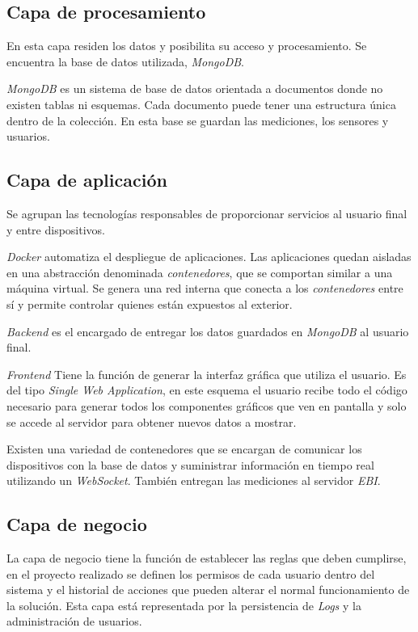 	\subsection{Capa de procesamiento}
	\label{capaProcesamiento}
	
		En esta capa residen los datos y posibilita su acceso y procesamiento. Se encuentra la base de datos utilizada, \emph{MongoDB}.
		
		\emph{MongoDB} es un sistema de base de datos orientada a documentos donde no existen tablas ni esquemas. Cada documento puede tener una estructura única dentro de la colección. En esta base se guardan las mediciones, los sensores y usuarios.
	
	\subsection{Capa de aplicación}
	\label{capaAplicacion}
	
		Se agrupan las tecnologías responsables de proporcionar servicios al usuario final y entre dispositivos.
		
		\emph{Docker} automatiza el despliegue de aplicaciones. Las aplicaciones quedan aisladas en una abstracción denominada \emph{contenedores}, que se comportan similar a una máquina virtual. Se genera una red interna que conecta a los \emph{contenedores} entre sí y permite controlar quienes están expuestos al exterior.
		
		\emph{Backend} es el encargado de entregar los datos guardados en \emph{MongoDB} al usuario final.
		
		\emph{Frontend} Tiene la función de generar la interfaz gráfica que utiliza el usuario. Es del tipo \emph{Single Web Application}, en este esquema el usuario recibe todo el código necesario para generar todos los componentes gráficos que ven en pantalla y solo se accede al servidor para obtener nuevos datos a mostrar.
		
		Existen una variedad de contenedores que se encargan de comunicar los dispositivos con la base de datos y suministrar información en tiempo real utilizando un \emph{WebSocket}. También entregan las mediciones al servidor \emph{EBI}.
	
	\subsection{Capa de negocio}
	\label{capaNegocio}
	
		La capa de negocio tiene la función de establecer las reglas que deben cumplirse, en el proyecto realizado se definen los permisos de cada usuario dentro del sistema y el historial de acciones que pueden alterar el normal funcionamiento de la solución. Esta capa está representada por la persistencia de \emph{Logs} y la administración de usuarios.

